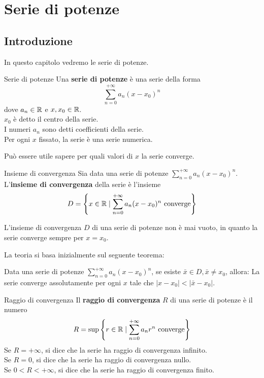 
\chapter{Serie di potenze}
\section{Introduzione}
In questo capitolo vedremo le serie di potenze.
\begin{definizione}{Serie di potenze}
    Una \textbf{serie di potenze} è una serie della forma
    \[
        \sum_{n=0}^{+\infty} a_n (x-x_0)^n
    \]
    dove $a_n \in \mathbb{R}$ e $x,x_0 \in \mathbb{R}$.\\
    $x_0$ è detto il centro della serie.\\
    I numeri $a_n$ sono detti coefficienti della serie.\\
    Per ogni $x$ fissato, la serie è una serie numerica.
\end{definizione}

Può essere utile sapere per quali valori di $x$ la serie converge.\\

\begin{definizione}{Insieme di convergenza}
    Sia data una serie di potenze $\sum_{n=0}^{+\infty} a_n (x-x_0)^n$.\\
    L'\textbf{insieme di convergenza} della serie è l'insieme
    \[
        D=\left\{ x \in \mathbb{R} \mid \sum_{n=0}^{+\infty} a_n (x-x_0)^n \text{ converge} \right\}
    \]
\end{definizione}

\begin{osservazione}{}
    L'insieme di convergenza $D$ di una serie di potenze non è mai vuoto, in quanto la serie converge sempre per $x=x_0$.
\end{osservazione}


La teoria si basa inizialmente sul seguente teorema:
\begin{teorema}{}
  Data una serie di potenze $\sum_{n=0}^{+\infty} a_n (x-x_0)^n$, se esiste $\bar{x} \in D, \bar{x}\neq x_0$, allora:
  La serie converge assolutamente per ogni $x$ tale che $\lvert x - x_0 \rvert < \lvert \bar{x} - x_0 \rvert$.\\
\end{teorema}

\begin{definizione}{Raggio di convergenza}
  Il \textbf{raggio di convergenza} $R$ di una serie di potenze è il numero
  \[
      R = \sup \left\{ r \in \mathbb{R} \mid \sum_{n=0}^{+\infty} a_n r^n \text{ converge} \right\}
  \]
  Se $R = +\infty$, si dice che la serie ha raggio di convergenza infinito.\\
  Se $R = 0$, si dice che la serie ha raggio di convergenza nullo.\\
  Se $0 < R < +\infty$, si dice che la serie ha raggio di convergenza finito.
\end{definizione}

